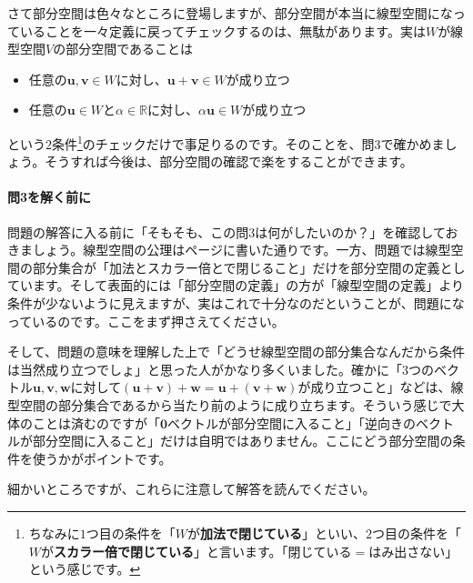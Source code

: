 さて部分空間は色々なところに登場しますが、部分空間が本当に線型空間になっていることを一々定義に戻ってチェックするのは、無駄があります。実は$W$が線型空間$V$の部分空間であることは
\begin{itemize}
\item 任意の$\bm{u}, \bm{v}\in W$に対し、$\bm{u} + \bm{v} \in W$が成り立つ
\item 任意の$\bm{u}\in W$と$\alpha \in \mathbb{R}$に対し、$\alpha \bm{u}\in W$が成り立つ
\end{itemize}
という$2$条件\footnote{ちなみに$1$つ目の条件を「$W$が\textbf{加法で閉じている}」といい、$2$つ目の条件を「$W$が\textbf{スカラー倍で閉じている}」と言います。「閉じている$=$はみ出さない」という感じです。}のチェックだけで事足りるのです。そのことを、問3で確かめましょう。そうすれば今後は、部分空間の確認で楽をすることができます。

\paragraph{問3を解く前に} 問題の解答に入る前に「そもそも、この問3は何がしたいのか？」を確認しておきましょう。線型空間の公理は\pageref{def:vector_space}ページに書いた通りです。一方、問題では線型空間の部分集合が「加法とスカラー倍とで閉じること」だけを部分空間の定義としています。そして表面的には「部分空間の定義」の方が「線型空間の定義」より条件が少ないように見えますが、実はこれで十分なのだということが、問題になっているのです。ここをまず押さえてください。

そして、問題の意味を理解した上で「どうせ線型空間の部分集合なんだから条件は当然成り立つでしょ」と思った人がかなり多くいました。確かに「$3$つのベクトル$\bm{u}, \bm{v}, \bm{w}$に対して$(\bm{u} + \bm{v}) + \bm{w} = \bm{u} + (\bm{v} + \bm{w})$が成り立つこと」などは、線型空間の部分集合であるから当たり前のように成り立ちます。そういう感じで大体のことは済むのですが「$\bm{0}$ベクトルが部分空間に入ること」「逆向きのベクトルが部分空間に入ること」だけは自明ではありません。ここにどう部分空間の条件を使うかがポイントです。

細かいところですが、これらに注意して解答を読んでください。

